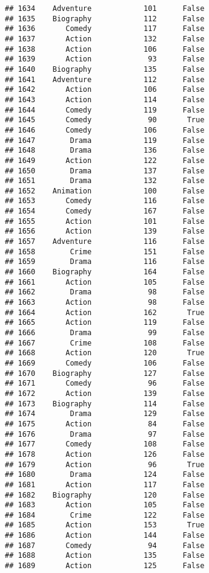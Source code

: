 \documentclass[
]{article}
\begin{document}
\begin{verbatim}
## 1634    Adventure            101      False
## 1635    Biography            112      False
## 1636       Comedy            117      False
## 1637       Action            132      False
## 1638       Action            106      False
## 1639       Action             93      False
## 1640    Biography            135      False
## 1641    Adventure            112      False
## 1642       Action            106      False
## 1643       Action            114      False
## 1644       Comedy            119      False
## 1645       Comedy             90       True
## 1646       Comedy            106      False
## 1647        Drama            119      False
## 1648        Drama            136      False
## 1649       Action            122      False
## 1650        Drama            137      False
## 1651        Drama            132      False
## 1652    Animation            100      False
## 1653       Comedy            116      False
## 1654       Comedy            167      False
## 1655       Action            101      False
## 1656       Action            139      False
## 1657    Adventure            116      False
## 1658        Crime            151      False
## 1659        Drama            116      False
## 1660    Biography            164      False
## 1661       Action            105      False
## 1662        Drama             98      False
## 1663       Action             98      False
## 1664       Action            162       True
## 1665       Action            119      False
## 1666        Drama             99      False
## 1667        Crime            108      False
## 1668       Action            120       True
## 1669       Comedy            106      False
## 1670    Biography            127      False
## 1671       Comedy             96      False
## 1672       Action            139      False
## 1673    Biography            114      False
## 1674        Drama            129      False
## 1675       Action             84      False
## 1676        Drama             97      False
## 1677       Comedy            108      False
## 1678       Action            126      False
## 1679       Action             96       True
## 1680        Drama            124      False
## 1681       Action            117      False
## 1682    Biography            120      False
## 1683       Action            105      False
## 1684        Crime            122      False
## 1685       Action            153       True
## 1686       Action            144      False
## 1687       Comedy             94      False
## 1688       Action            135      False
## 1689       Action            125      False

\end{verbatim}
\end{document}
